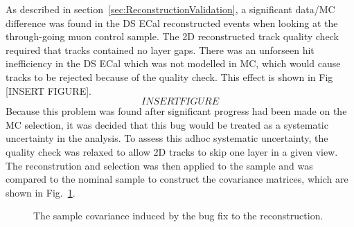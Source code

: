 \newline
\newline
As described in section~\ref{sec:ReconstructionValidation}, a significant data/MC difference was found in the DS ECal reconstructed events when looking at the through-going muon control sample.  The 2D reconstructed track quality check required that tracks contained no layer gaps.  There was an unforseen hit inefficiency in the DS ECal which was not modelled in MC, which would cause tracks to be rejected because of the quality check.  This effect is shown in Fig [INSERT FIGURE].
\begin{equation}
INSERT FIGURE
\end{equation}
Because this problem was found after significant progress had been made on the MC selection, it was decided that this bug would be treated as a systematic uncertainty in the analysis.  To assess this adhoc systematic uncertainty, the quality check was relaxed to allow 2D tracks to skip one layer in a given view.  The reconstrution and selection was then applied to the sample and was compared to the nominal sample to construct the covariance matrices, which are shown in Fig.~\ref{fig:ECalHoughBugCovarianceMatrices}.
\begin{figure}%
  \centering
  \caption{The sample covariance induced by the bug fix to the reconstruction.}
  \label{fig:ECalHoughBugCovarianceMatrices}
\end{figure}
